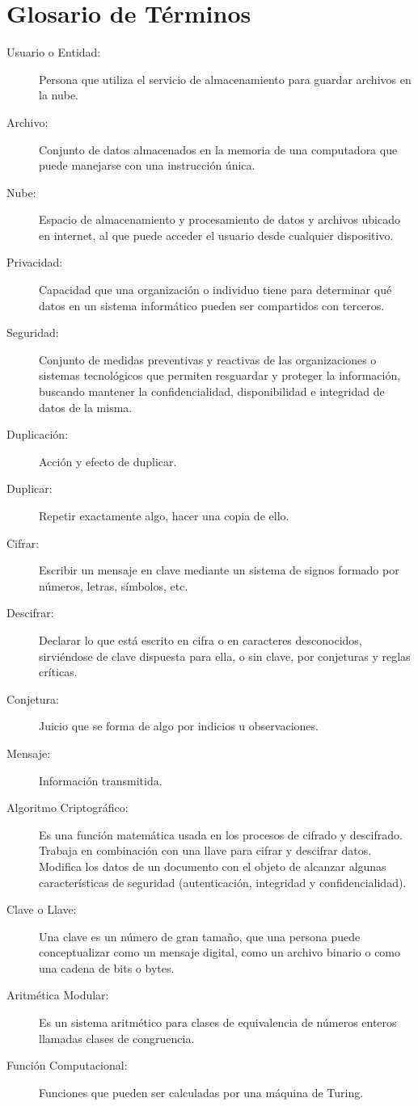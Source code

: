 \section{Glosario de Términos}

\begin{description}
\item [Usuario o Entidad:] Persona que utiliza el servicio de almacenamiento para guardar archivos en la nube.
\item [Archivo: ] Conjunto de datos almacenados en la memoria de una computadora que puede manejarse con una instrucción única.
\item [Nube: ] Espacio de almacenamiento y procesamiento de datos y archivos ubicado en internet, al que puede acceder el usuario desde cualquier dispositivo. 
\item [Privacidad: ] Capacidad que una organización o individuo tiene para determinar qué datos en un sistema informático pueden ser compartidos con terceros.
\item [Seguridad: ] Conjunto de medidas preventivas y reactivas de las organizaciones o sistemas tecnológicos que permiten resguardar y proteger la información, buscando mantener la confidencialidad, disponibilidad e integridad de datos de la misma.
\item [Duplicación: ] Acción y efecto de duplicar.
\item [Duplicar: ] Repetir exactamente algo, hacer una copia de ello.
\item [Cifrar: ] Escribir un mensaje en clave mediante un sistema de signos formado por números, letras, símbolos, etc.
\item [Descifrar: ] Declarar lo que está escrito en cifra o en caracteres desconocidos, sirviéndose de clave dispuesta para ella, o sin clave, por conjeturas y reglas críticas.
\item [Conjetura: ] Juicio que se forma de algo por indicios u observaciones.
\item [Mensaje: ] Información transmitida.
\item [Algoritmo Criptográfico: ] Es una función matemática usada en los procesos de cifrado y descifrado. Trabaja en combinación con una llave para cifrar y descifrar datos. 
Modifica los datos de un documento con el objeto de alcanzar algunas características de seguridad (autenticación, integridad y confidencialidad).
\item [Clave o Llave: ] Una clave es un número de gran tamaño, que una persona puede conceptualizar como un mensaje digital, como un archivo binario o como una cadena de bits o bytes.
\item [Aritmética Modular: ] Es un sistema aritmético para clases de equivalencia de números enteros llamadas clases de congruencia. 
\item [Función Computacional: ] Funciones que pueden ser calculadas por una máquina de Turing.
\end{description}


